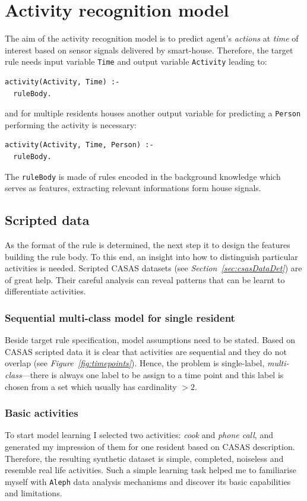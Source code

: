 \documentclass[11pt, a4paper, pdflatex, leqno, twoside, openright]{report}
\begin{document}
\chapter{Activity recognition model}
The aim of the activity recognition model is to predict agent's \emph{actions} at \emph{time} of interest based on sensor signals delivered by smart-house. Therefore, the target rule needs input variable \texttt{Time} and output variable \texttt{Activity} leading to:\\
\begin{verbatim}
activity(Activity, Time) :-
  ruleBody.
\end{verbatim}
and for multiple residents houses another output variable for predicting a \texttt{Person} performing the activity is necessary:\\
\begin{verbatim}
activity(Activity, Time, Person) :-
  ruleBody.
\end{verbatim}
The \texttt{ruleBody} is made of rules encoded in the background knowledge which serves as features, extracting relevant informations form house signals.

  \section{Scripted data} %
As the format of the rule is determined, the next step it to design the features building the rule body. To this end, an insight into how to distinguish particular activities is needed. Scripted CASAS datasets (see \emph{Section~\ref{sec:csasDataDet}}) are of great help. Their careful analysis can reveal patterns that can be learnt to differentiate activities.

    \subsection{Sequential multi-class model for single resident\label{ch:smcm}}
Beside target rule specification, model assumptions need to be stated. Based on CASAS scripted data it is clear that activities are sequential and they do not overlap (see \emph{Figure~\ref{fig:timepoints}}). Hence, the problem is single-label, \emph{multi-class}---there is always one label to be assign to a time point and this label is chosen from a set which usually has cardinality $>2$.

    \subsection{Basic activities\label{sec:basicActibities}}
To start model learning I selected two activities: \emph{cook} and \emph{phone call}, and generated my impression of them for one resident based on CASAS description. Therefore, the resulting synthetic dataset is simple, completed, noiseless and resemble real life activities. Such a simple learning task helped me to familiarise myself with \texttt{Aleph} data analysis mechanisms and discover its basic capabilities and limitations.
\end{document}
